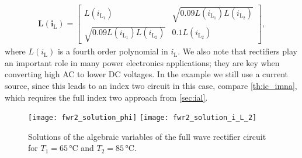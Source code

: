 \documentclass[AMA,STIX1COL]{WileyNJD-v2}
\newcommand{\mb}[1]{\mathbf{#1}}
\newcommand{\mr}[1]{\mathrm{#1}}
\renewcommand{\i}[1]{\mb{i}_\mr{#1}}
\begin{document}
\begin{align*}
    \mb{L}(\i{L}) = \begin{bmatrix}
        L(i_{\mr{L}_1}) & \sqrt{0.09 L(i_{\mr{L}_1}) L(i_{\mr{L}_2})}\\
        \sqrt{0.09 L(i_{\mr{L}_1}) L(i_{\mr{L}_2})} & 0.1 L(i_{\mr{L}_2})
    \end{bmatrix},
\end{align*}
where $L(i_\mr{L})$ is a fourth order polynomial in $i_\mr{L}$\cite{lullo2017}. We also note that rectifiers play an important role in many power electronics applications; they are key when converting high AC to lower DC voltages. In the example we still use a current source, since this leads to an index two circuit in this case, compare \autoref{th:ic_imna}, which requires the full index two approach from \autoref{sec:ial}.
\begin{figure}[t]
    \begin{center}
        \texttt{[image: fwr2\_solution\_phi]} \hspace{1.5cm} \texttt{[image: fwr2\_solution\_i\_L\_2]}
    \end{center}
    \caption{Solutions of the algebraic variables of the full wave rectifier circuit for $T_1 = 65\, \si{\celsius}$ and $T_2 = 85\, \si{\celsius}$.}
    \label{fig:ne_fwr2_solution_a}
\end{figure}
\end{document}
